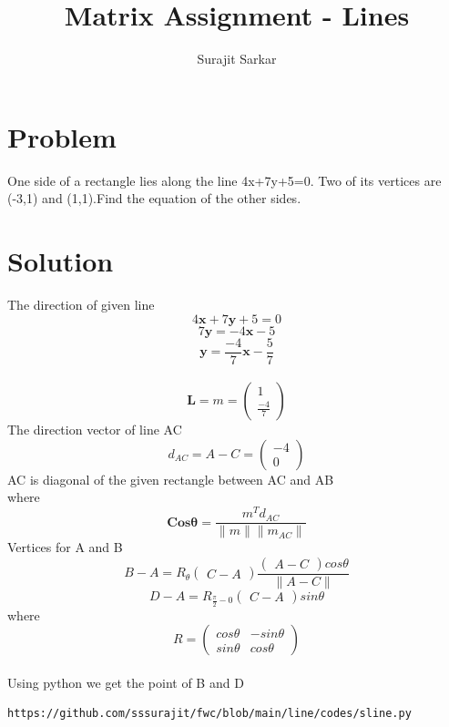 \documentclass[journal,12pt,twocolumn]{IEEEtran}
\title{\mytitle}
\title{
Matrix Assignment - Lines
}
\author{Surajit Sarkar}
\newcommand{\myvec}[1]{\ensuremath{\begin{pmatrix}#1\end{pmatrix}}}
\let\vec\mathbf
\begin{document}
\maketitle
\tableofcontents
\bigskip


\section{\textbf{Problem}}
One side of a rectangle lies along the line 4x+7y+5=0.
Two of its vertices are (-3,1) and (1,1).Find the equation of the other sides.


\section{\textbf{Solution}}
The direction of given line
\begin{equation}
    4\vec x+7 \vec y +5=0
\end{equation}
\begin{equation}
    7\vec y=-4\vec x-5
\end{equation}
\begin{equation}
    \vec y=\frac{-4}{7} \vec x-\frac{5}{7}
\end{equation}
\\
\begin{equation}
	\vec L =m= \myvec{1\\{\frac{-4}{7}}}
\end{equation}
The direction vector of line AC 
\begin{equation}
    d_{AC}=A-C=\myvec{-4\\0}
\end{equation}
AC is diagonal of the given rectangle between AC and AB
\\

where
\\
\begin{equation}
    \vec{Cos\theta} = {\frac{m^Td_{AC}}{\|m\|\|m_{AC}\|}}
\end{equation}
Vertices for A and B
\begin{equation}
	B-A=R_{\theta}{\myvec{C-A}} {\frac{\myvec{A-C}cos \theta}{\|A-C\|}}
\end{equation}
\begin{equation}
    D-A=R_{\frac{\pi}{2}-0} \myvec{C-A} sin\theta
\end{equation}
where
\begin{equation}
    R=\myvec{cos\theta&-sin\theta\\sin\theta&cos\theta}
\end{equation}
\\
Using python we get the point of B and D
\begin{lstlisting}
https://github.com/sssurajit/fwc/blob/main/line/codes/sline.py
\end{lstlisting}
\end{document}
